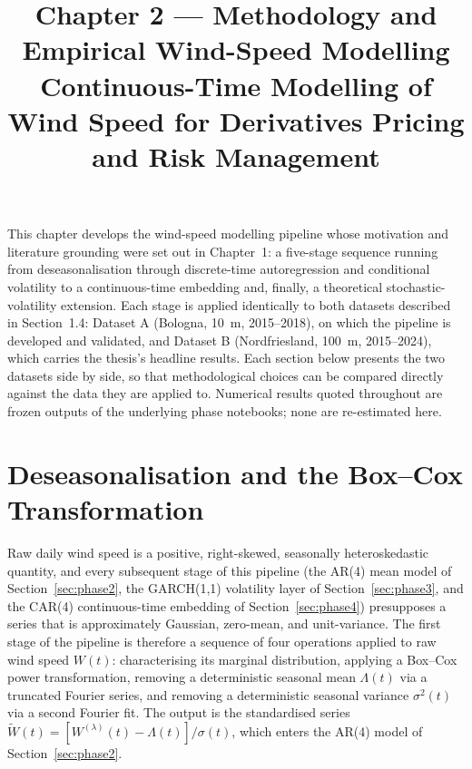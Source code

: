 \usepackage[utf8]{inputenc}
\usepackage[a4paper, left=1.5in, right=1.5in, top=1in, bottom=1in]{geometry}
\usepackage{amsmath, amssymb, amsfonts}
\usepackage{textcomp}
\usepackage{booktabs, tabularx, array}
\usepackage{graphicx, caption, subcaption}
\usepackage[hidelinks]{hyperref}
\usepackage{natbib}

\usepackage{newtxtext, newtxmath}
\usepackage{setspace}
\onehalfspacing

\title{\textbf{Chapter 2 --- Methodology and Empirical Wind-Speed Modelling}\\[4pt]
\large Continuous-Time Modelling of Wind Speed for Derivatives Pricing and Risk Management}
\author{}
\date{}



\maketitle

This chapter develops the wind-speed modelling pipeline whose motivation and literature grounding were set out in Chapter~1: a five-stage sequence running from deseasonalisation through discrete-time autoregression and conditional volatility to a continuous-time embedding and, finally, a theoretical stochastic-volatility extension. Each stage is applied identically to both datasets described in Section~1.4: Dataset A (Bologna, 10~m, 2015--2018), on which the pipeline is developed and validated, and Dataset B (Nordfriesland, 100~m, 2015--2024), which carries the thesis's headline results. Each section below presents the two datasets side by side, so that methodological choices can be compared directly against the data they are applied to. Numerical results quoted throughout are frozen outputs of the underlying phase notebooks; none are re-estimated here.

\section{Deseasonalisation and the Box--Cox Transformation}
\label{sec:phase1}

Raw daily wind speed is a positive, right-skewed, seasonally heteroskedastic quantity, and every subsequent stage of this pipeline (the AR(4) mean model of Section~\ref{sec:phase2}, the GARCH(1,1) volatility layer of Section~\ref{sec:phase3}, and the CAR(4) continuous-time embedding of Section~\ref{sec:phase4}) presupposes a series that is approximately Gaussian, zero-mean, and unit-variance. The first stage of the pipeline is therefore a sequence of four operations applied to raw wind speed $W(t)$: characterising its marginal distribution, applying a Box--Cox power transformation, removing a deterministic seasonal mean $\Lambda(t)$ via a truncated Fourier series, and removing a deterministic seasonal variance $\sigma^2(t)$ via a second Fourier fit. The output is the standardised series $\widetilde W(t) = [W^{(\lambda)}(t) - \Lambda(t)]/\sigma(t)$, which enters the AR(4) model of Section~\ref{sec:phase2}.

